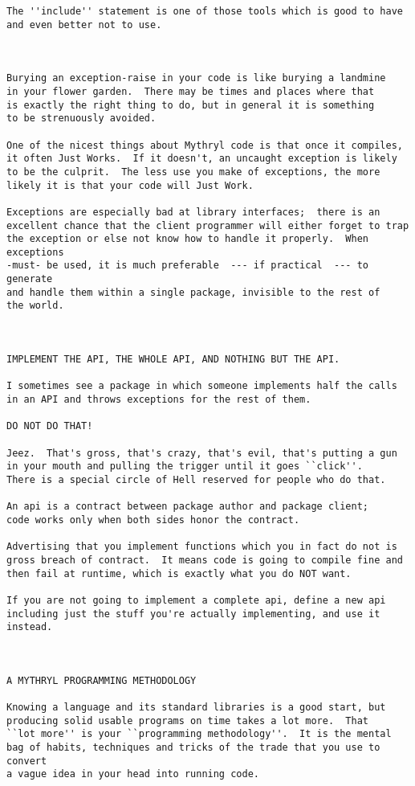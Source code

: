 \begin{verbatim}
The ''include'' statement is one of those tools which is good to have and even better not to use. 



Burying an exception-raise in your code is like burying a landmine 
in your flower garden.  There may be times and places where that 
is exactly the right thing to do, but in general it is something 
to be strenuously avoided. 

One of the nicest things about Mythryl code is that once it compiles, 
it often Just Works.  If it doesn't, an uncaught exception is likely 
to be the culprit.  The less use you make of exceptions, the more 
likely it is that your code will Just Work. 

Exceptions are especially bad at library interfaces;  there is an 
excellent chance that the client programmer will either forget to trap 
the exception or else not know how to handle it properly.  When exceptions 
-must- be used, it is much preferable  --- if practical  --- to generate 
and handle them within a single package, invisible to the rest of 
the world. 



IMPLEMENT THE API, THE WHOLE API, AND NOTHING BUT THE API. 

I sometimes see a package in which someone implements half the calls 
in an API and throws exceptions for the rest of them. 

DO NOT DO THAT! 

Jeez.  That's gross, that's crazy, that's evil, that's putting a gun 
in your mouth and pulling the trigger until it goes ``click''. 
There is a special circle of Hell reserved for people who do that. 

An api is a contract between package author and package client; 
code works only when both sides honor the contract. 

Advertising that you implement functions which you in fact do not is 
gross breach of contract.  It means code is going to compile fine and 
then fail at runtime, which is exactly what you do NOT want. 

If you are not going to implement a complete api, define a new api 
including just the stuff you're actually implementing, and use it 
instead. 



A MYTHRYL PROGRAMMING METHODOLOGY 

Knowing a language and its standard libraries is a good start, but 
producing solid usable programs on time takes a lot more.  That 
``lot more'' is your ``programming methodology''.  It is the mental 
bag of habits, techniques and tricks of the trade that you use to convert 
a vague idea in your head into running code. 


\end{verbatim}

